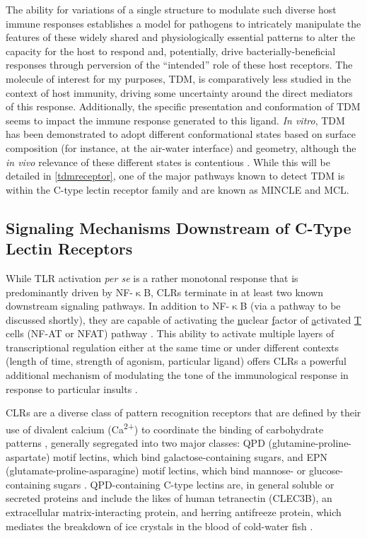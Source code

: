 The ability for variations of a single structure to modulate such diverse host immune responses establishes a model for pathogens to intricately manipulate the features of these widely shared and physiologically essential patterns to alter the capacity for the host to respond and, potentially, drive bacterially\hyp{}beneficial responses through perversion of the ``intended'' role of these host receptors. The molecule of interest for my purposes, TDM, is comparatively less studied in the context of host immunity, driving some uncertainty around the direct mediators of this response. Additionally, the specific presentation and conformation of TDM seems to impact the immune response generated to this ligand. \textit{In vitro}, TDM has been demonstrated to adopt different conformational states based on surface composition (for instance, at the air\hyp{}water interface) and geometry, although the \textit{in vivo} relevance of these different states is contentious \citep{Hunter2006b, Behling1993}. While this will be detailed in \autoref{tdmreceptor}, one of the major pathways known to detect TDM is within the C\hyp{}type lectin receptor family and are known as MINCLE and MCL.

\subsection{Signaling Mechanisms Downstream of C\hyp{}Type Lectin Receptors}\label{clrsig}

While TLR activation \textit{per se} is a rather monotonal response that is predominantly driven by NF\hyp{}$\upkappa$B, CLRs terminate in at least two known downstream signaling pathways. In addition to NF\hyp{}$\upkappa$B (via a pathway to be discussed shortly), they are capable of activating the \underline{n}uclear \underline{f}actor of \underline{a}ctivated \underline{T} cells (NF\hyp{}AT or NFAT) pathway \citep{Goodridge2007, Dambuza2015}. This ability to activate multiple layers of transcriptional regulation either at the same time or under different contexts (length of time, strength of agonism, particular ligand) offers CLRs a powerful additional mechanism of modulating the tone of the immunological response in response to particular insults \citep{Brown2018}. 

CLRs are a diverse class of pattern recognition receptors that are defined by their use of divalent calcium (Ca\textsuperscript{2+}) to coordinate the binding of carbohydrate patterns \citep{Hosoi1998, Dodd2001}, generally segregated into two major classes: QPD (glutamine\hyp{}proline\hyp{}aspartate) motif lectins, which bind galactose\hyp{}containing sugars, and EPN (glutamate\hyp{}proline\hyp{}asparagine) motif lectins, which bind mannose\hyp{} or glucose\hyp{}containing sugars \citep{Furukawa2013, Alenton2017, Zelensky2005, Holtet1997}. QPD\hyp{}containing C\hyp{}type lectins are, in general soluble or secreted proteins and include the likes of human tetranectin (CLEC3B), an extracellular matrix\hyp{}interacting protein, and herring antifreeze protein, which mediates the breakdown of ice crystals in the blood of cold\hyp{}water fish \citep{Liu2007, Ewart1998, Ewart1993, Graversen1998, Nielsen1997}. 

